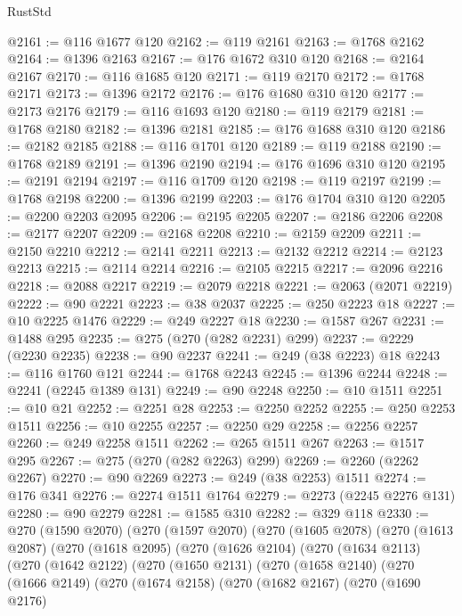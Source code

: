 \begin{lexlean}{RustStd}
\begin{coremodule}
@2161 := @116 @1677 @120
@2162 := @119 @2161
@2163 := @1768 @2162
@2164 := @1396 @2163
@2167 := @176 @1672 @310 @120
@2168 := @2164 @2167
@2170 := @116 @1685 @120
@2171 := @119 @2170
@2172 := @1768 @2171
@2173 := @1396 @2172
@2176 := @176 @1680 @310 @120
@2177 := @2173 @2176
@2179 := @116 @1693 @120
@2180 := @119 @2179
@2181 := @1768 @2180
@2182 := @1396 @2181
@2185 := @176 @1688 @310 @120
@2186 := @2182 @2185
@2188 := @116 @1701 @120
@2189 := @119 @2188
@2190 := @1768 @2189
@2191 := @1396 @2190
@2194 := @176 @1696 @310 @120
@2195 := @2191 @2194
@2197 := @116 @1709 @120
@2198 := @119 @2197
@2199 := @1768 @2198
@2200 := @1396 @2199
@2203 := @176 @1704 @310 @120
@2205 := @2200 @2203 @2095
@2206 := @2195 @2205
@2207 := @2186 @2206
@2208 := @2177 @2207
@2209 := @2168 @2208
@2210 := @2159 @2209
@2211 := @2150 @2210
@2212 := @2141 @2211
@2213 := @2132 @2212
@2214 := @2123 @2213
@2215 := @2114 @2214
@2216 := @2105 @2215
@2217 := @2096 @2216
@2218 := @2088 @2217
@2219 := @2079 @2218
@2221 := @2063 (@2071 @2219)
@2222 := @90 @2221
@2223 := @38 @2037
@2225 := @250 @2223 @18
@2227 := @10 @2225 @1476
@2229 := @249 @2227 @18
@2230 := @1587 @267
@2231 := @1488 @295
@2235 := @275 (@270 (@282 @2231) @299)
@2237 := @2229 (@2230 @2235)
@2238 := @90 @2237
@2241 := @249 (@38 @2223) @18
@2243 := @116 @1760 @121
@2244 := @1768 @2243
@2245 := @1396 @2244
@2248 := @2241 (@2245 @1389 @131)
@2249 := @90 @2248
@2250 := @10 @1511
@2251 := @10 @21
@2252 := @2251 @28
@2253 := @2250 @2252
@2255 := @250 @2253 @1511
@2256 := @10 @2255
@2257 := @2250 @29
@2258 := @2256 @2257
@2260 := @249 @2258 @1511
@2262 := @265 @1511 @267
@2263 := @1517 @295
@2267 := @275 (@270 (@282 @2263) @299)
@2269 := @2260 (@2262 @2267)
@2270 := @90 @2269
@2273 := @249 (@38 @2253) @1511
@2274 := @176 @341
@2276 := @2274 @1511 @1764
@2279 := @2273 (@2245 @2276 @131)
@2280 := @90 @2279
@2281 := @1585 @310
@2282 := @329 @118
@2330 := @270
    (@1590 @2070)
    (@270
      (@1597 @2070)
      (@270
        (@1605 @2078)
        (@270
          (@1613 @2087)
          (@270
            (@1618 @2095)
            (@270
              (@1626 @2104)
              (@270
                (@1634 @2113)
                (@270
                  (@1642 @2122)
                  (@270
                    (@1650 @2131)
                    (@270
                      (@1658 @2140)
                      (@270
                        (@1666 @2149)
                        (@270
                          (@1674 @2158)
                          (@270
                            (@1682 @2167)
                            (@270
                              (@1690 @2176)

\end{coremodule}
\end{lexlean}
